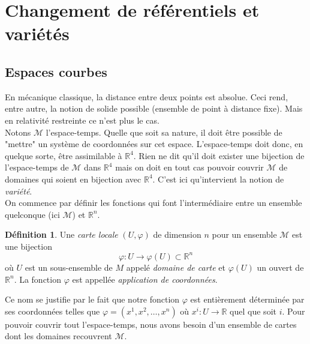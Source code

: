 \documentclass[a4paper,11pt]{report}
\theoremstyle{definition}
\theoremstyle{plain}
\theoremstyle{definition}
\newtheorem{defn}{Définition}[chapter]
\theoremstyle{remark}
\newcommand{\M}{\mathscr{M}}
\begin{document}
    \section{Changement de référentiels et variétés}
    
        \subsection{Espaces courbes}
        
            En mécanique classique, la distance entre deux points est absolue. Ceci rend, entre autre, la notion de solide possible (ensemble de point à distance fixe). Mais en relativité restreinte ce n'est plus le cas. \\
            
            Notons $\M$ l'espace-temps. Quelle que soit sa nature, il doit être possible de "mettre" un système de coordonnées sur cet espace. L'espace-temps doit donc, en quelque sorte, être assimilable à $\mathbb{R}^4$. Rien ne dit qu'il doit exister une bijection de l'espace-temps de $\M$ dans $\mathbb{R}^4$ mais on doit en tout cas pouvoir couvrir $\M$ de domaines qui soient en bijection avec $\mathbb{R}^4$. C'est ici qu'intervient la notion de \textit{variété}.\\
            
            On commence par définir les fonctions qui font l'intermédiaire entre un ensemble quelconque (ici $\M$) et $\mathbb{R}^n$.
            \begin{defn}
                Une \textit{carte locale} $(U,\varphi)$ de dimension $n$ pour un ensemble $\M$ est une bijection
                \begin{equation}
                    \varphi:U\to\varphi(U) \subset\mathbb{R}^n
                \end{equation}
                où $U$ est un sous-ensemble de $M$ appelé \textit{domaine de carte} et $\varphi(U)$ un ouvert de $\mathbb{R}^n$. La fonction $\varphi$ est appellée \textit{application de coordonnées}.
            \end{defn}
            
            Ce nom se justifie par le fait que notre fonction $\varphi$ est entièrement déterminée par ses coordonnées telles que $\varphi = (x^1, x^2, \ldots, x^n)$ où $x^i: U \to \mathbb{R}$ quel que soit $i$. Pour pouvoir couvrir tout l'espace-temps, nous avons besoin d'un ensemble de cartes dont les domaines recouvrent $\M$.
            
\end{document}
